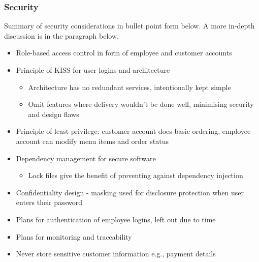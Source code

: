 \documentclass{article}
\begin{document}
\subsubsection*{Security}
Summary of security considerations in bullet point form below. A more in-depth discussion is in the paragraph below.
\begin{itemize}
    \item Role-based access control in form of employee and customer accounts
    \item Principle of KISS for user logins and architecture
        \begin{itemize}
         \item Architecture has no redundant services, intentionally kept simple
         \item Omit features where delivery wouldn't be done well, minimising security and design flaws 
         \end{itemize}
    \item Principle of least privilege: customer account does basic ordering, employee account can modify menu items and order status
    \item Dependency management for secure software
        \begin{itemize}
         \item Lock files give the benefit of preventing against dependency injection
        \end{itemize}
    \item Confidentiality design - masking used for disclosure protection when user enters their password
    \item Plans for authentication of employee logins, left out due to time
    \item Plans for monitoring and traceability
    \item Never store sensitive customer information e.g., payment details
\end{itemize}
\end{document}
